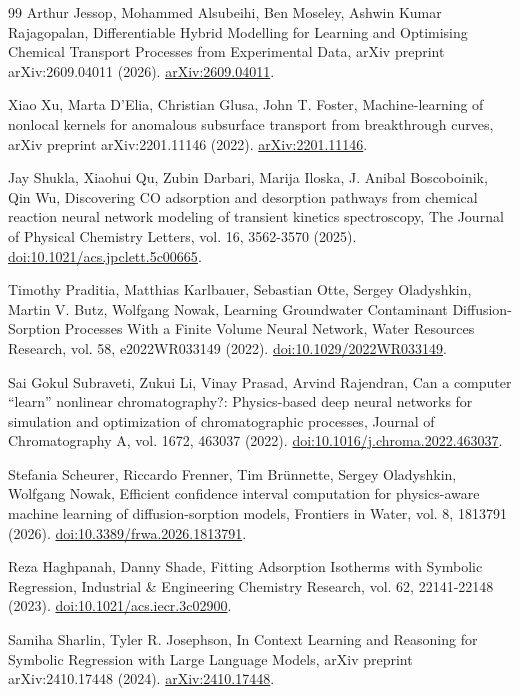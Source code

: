 \documentclass[11pt]{article}
\begin{document}
\begin{thebibliography}{99}
 Arthur Jessop, Mohammed Alsubeihi, Ben Moseley, Ashwin Kumar Rajagopalan, Differentiable Hybrid Modelling for Learning and Optimising Chemical Transport Processes from Experimental Data, arXiv preprint arXiv:2609.04011 (2026). \href{https://arxiv.org/abs/2609.04011}{arXiv:2609.04011}.

 Xiao Xu, Marta D'Elia, Christian Glusa, John T. Foster, Machine-learning of nonlocal kernels for anomalous subsurface transport from breakthrough curves, arXiv preprint arXiv:2201.11146 (2022). \href{https://arxiv.org/abs/2201.11146}{arXiv:2201.11146}.

 Jay Shukla, Xiaohui Qu, Zubin Darbari, Marija Iloska, J. Anibal Boscoboinik, Qin Wu, Discovering CO adsorption and desorption pathways from chemical reaction neural network modeling of transient kinetics spectroscopy, The Journal of Physical Chemistry Letters, vol. 16, 3562-3570 (2025). \href{https://doi.org/10.1021/acs.jpclett.5c00665}{doi:10.1021/acs.jpclett.5c00665}.

 Timothy Praditia, Matthias Karlbauer, Sebastian Otte, Sergey Oladyshkin, Martin V. Butz, Wolfgang Nowak, Learning Groundwater Contaminant Diffusion-Sorption Processes With a Finite Volume Neural Network, Water Resources Research, vol. 58, e2022WR033149 (2022). \href{https://doi.org/10.1029/2022WR033149}{doi:10.1029/2022WR033149}.

 Sai Gokul Subraveti, Zukui Li, Vinay Prasad, Arvind Rajendran, Can a computer ``learn'' nonlinear chromatography?: Physics-based deep neural networks for simulation and optimization of chromatographic processes, Journal of Chromatography A, vol. 1672, 463037 (2022). \href{https://doi.org/10.1016/j.chroma.2022.463037}{doi:10.1016/j.chroma.2022.463037}.

 Stefania Scheurer, Riccardo Frenner, Tim Brünnette, Sergey Oladyshkin, Wolfgang Nowak, Efficient confidence interval computation for physics-aware machine learning of diffusion-sorption models, Frontiers in Water, vol. 8, 1813791 (2026). \href{https://doi.org/10.3389/frwa.2026.1813791}{doi:10.3389/frwa.2026.1813791}.

 Reza Haghpanah, Danny Shade, Fitting Adsorption Isotherms with Symbolic Regression, Industrial \& Engineering Chemistry Research, vol. 62, 22141-22148 (2023). \href{https://doi.org/10.1021/acs.iecr.3c02900}{doi:10.1021/acs.iecr.3c02900}.

 Samiha Sharlin, Tyler R. Josephson, In Context Learning and Reasoning for Symbolic Regression with Large Language Models, arXiv preprint arXiv:2410.17448 (2024). \href{https://arxiv.org/abs/2410.17448}{arXiv:2410.17448}.



\end{thebibliography}
\end{document}

